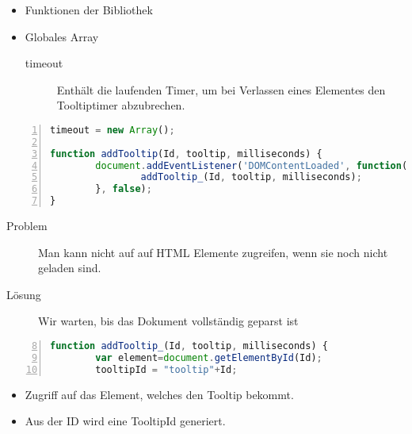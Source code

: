 \begin{frame}[<+->]
\begin{itemize}
\item Funktionen der Bibliothek
\normalsize
\item Globales Array
\small
\begin{description}
\item[timeout]Enthält die laufenden Timer, um bei Verlassen eines Elementes den Tooltiptimer abzubrechen.
\end{description}
\end{itemize}
\end{frame}
\begin{frame}[<+->][fragile]
\tiny{\begin{lstlisting}[language=JavaScript, 
		   numbers=left,
		   numbersep=3pt,
		   breaklines=true]		 
timeout = new Array();

function addTooltip(Id, tooltip, milliseconds) {
        document.addEventListener('DOMContentLoaded', function(e){
                addTooltip_(Id, tooltip, milliseconds);
        }, false);
}
\end{lstlisting}}
\normalsize
\begin{description}
\item[Problem]Man kann nicht auf auf HTML Elemente zugreifen, wenn sie noch nicht geladen sind.
\item[Lösung]Wir warten, bis das Dokument vollständig geparst ist
\end{description}
\end{frame}
\begin{frame}[<+->][fragile]
\tiny{\begin{lstlisting}[language=JavaScript, 
		   numbers=left,
		   numbersep=3pt,
		   breaklines=true,
		   firstnumber=8]
function addTooltip_(Id, tooltip, milliseconds) {
        var element=document.getElementById(Id);
        tooltipId = "tooltip"+Id;
\end{lstlisting}}
\normalsize
\pause
\begin{itemize}
\item Zugriff auf das Element, welches den Tooltip bekommt.
\item Aus der ID wird eine TooltipId generiert.
\end{itemize}
\end{frame}
